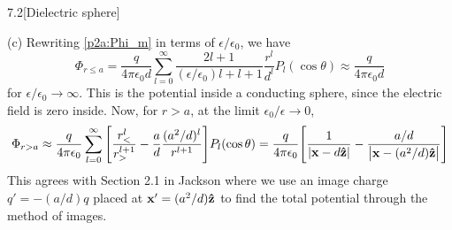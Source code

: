 \documentclass[12pt]{article}
\begin{document}
\begin{problem}{7.2}[Dielectric sphere]
\begin{solution}
(c) Rewriting \eqref{p2a:Phi_m} in terms of $\epsilon /\epsilon_0$, we have
\begin{equation}
    \Phi_{r\leq
    a}=\frac{q}{4\pi\epsilon_0d}\sum_{l=0}^\infty\frac{2l+1}{(\epsilon/\epsilon_0)l+l+1}\frac{r^l}{d^l}P_l(\cos\theta) 
    \approx\frac{q}{4\pi\epsilon_0d}
\end{equation}
for $\epsilon /\epsilon_0\to\infty$. This is the potential inside a conducting
sphere, since the electric field is zero inside. Now, for $r>a$, at the limit
$\epsilon_0 /\epsilon\to 0$,
\begin{equation}
    \Phi_{r>a}\approx\frac{q}{4\pi\epsilon_0}
    \sum_{l=0}^\infty\qty[\frac{r_<^l}{r_>^{l+1}}-\frac{a}{d}\frac{(a^2/d)^l}{r^{l+1}}]P_l(\cos\theta)
    =\frac{q}{4\pi\epsilon_0}\qty[\frac1{\abs{\vb{x}-d\vb{\hat{z}}}}-\frac{a/d}{\abs{\vb{x}-(a^2/d)\vb{\hat{z}}}}]
\end{equation}
This agrees with Section 2.1 in Jackson where we use an image charge
$q'=-(a /d)q$ placed at $\vb{x}'=(a^2 /d)\vb{\hat{z}}$ to find the total potential
through the method of images.
\end{solution}
\end{problem}
\end{document}
